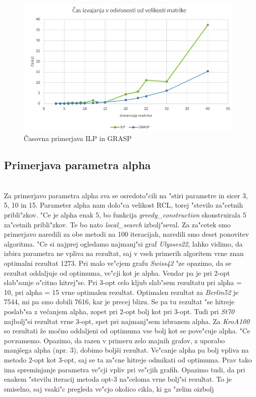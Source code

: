 \documentclass[12pt,a4paper]{amsart}
\theoremstyle{definition} %
\theoremstyle{plain} %
\begin{document}
\begin{figure}[H]
\caption{Časovna primerjava ILP in GRASP}
\centering
\includegraphics[scale =0.8]{casilp}
\end{figure}


\subsection{Primerjava parametra alpha} ~\\

Za primerjavo parametra alpha sva se osredoto"cili na "stiri parametre in sicer 3, 5, 10 in 15. Parameter alpha nam dolo"ca velikost RCL, torej "stevilo za"cetnih pribli"zkov. "Ce je alpha enak 5, bo funkcija \textit{greedy\_construction} skonstruirala 5 za"cetnih pribli"zkov. Te bo nato \textit{local\_search} izbolj"seval. Za za"cetek smo primerjavo naredili za obe metodi na 100 iteracijah, naredili smo deset ponovitev algoritma. "Ce si najprej ogledamo najmanj"si graf \textit{Ulysses22}, lahko vidimo, da izbira parametra ne vpliva na rezultat, saj v vseh primerih algoritem vrne znan optimalni rezultat 1273. Pri malo ve"cjem grafu \textit{Swiss42} "ze opazimo, da se rezultat oddaljuje od optimuma, ve"cji kot je alpha. Vendar pa je pri 2-opt slab"sanje o"citno hitrej"se. Pri 3-opt celo kljub slab"sem rezultatu pri alpha = 10, pri alpha = 15 vrne optimalen rezultat. Optimalen rezultat za \textit{Berlin52} je 7544, mi pa smo dobili 7616, kar je precej blizu. Se pa tu rezultat "se hitreje poslab"sa z večanjem alpha, zopet pri 2-opt bolj kot pri 3-opt. Tudi pri \textit{St70} najbolj"si rezultat vrne 3-opt, spet pri najmanj"sem izbranem alpha. Za \textit{KroA100} so rezultati že močno oddaljeni od optimuma vse bolj kot se pove"cuje alpha. 
"Ce povzamemo. Opazimo, da razen v primeru zelo majnih grafov, z uporabo manjšega alpha (npr. 3), dobimo boljši rezultat. Ve"canje alpha pa bolj vpliva na metodo 2-opt kot 3-opt, saj se ta za"cne hitreje odmikati od optimuma. Prav tako ima spreminjanje parametra ve"cji vpliv pri ve"cjih grafih. Opazimo tudi, da pri enakem "stevilu iteracij metoda opt-3 na"celoma vrne bolj"si rezultat. To je smiselno, saj vsaki"c pregleda ve"cjo okolico cikla, ki ga "zelim oizbolj
\end{document}
